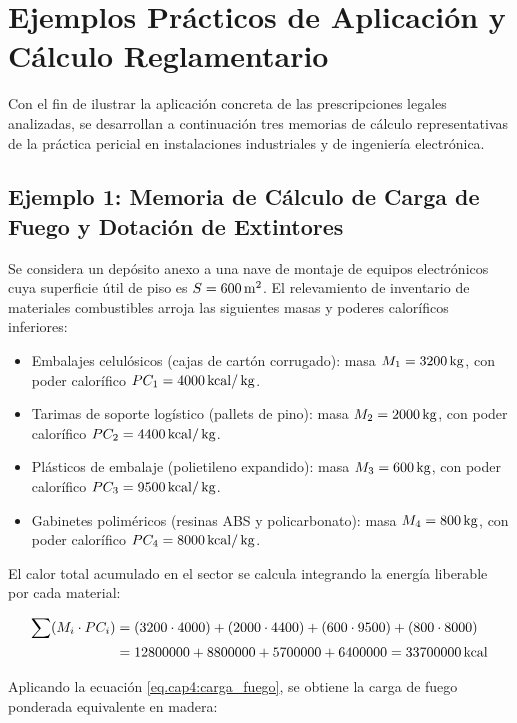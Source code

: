 \section{Ejemplos Prácticos de Aplicación y Cálculo Reglamentario}
\label{sec.cap4:ejemplos_practicos}

Con el fin de ilustrar la aplicación concreta de las prescripciones legales analizadas, se desarrollan a continuación
tres memorias de cálculo representativas de la práctica pericial en instalaciones industriales y de ingeniería
electrónica.

\subsection{Ejemplo 1: Memoria de Cálculo de Carga de Fuego y Dotación de Extintores}
\label{sec.cap4:ejemplo_carga_fuego}

Se considera un depósito anexo a una nave de montaje de equipos electrónicos cuya superficie útil de piso es $S = 600\,\mathrm{m}^2$.
El relevamiento de inventario de materiales combustibles arroja las siguientes masas y poderes caloríficos inferiores:

\begin{itemize}
    \item Embalajes celulósicos (cajas de cartón corrugado): masa $M_1 = 3200\,\mathrm{kg}$, con poder calorífico
          $PC_1 = 4000\,\mathrm{kcal}/\,\mathrm{kg}$.
    \item Tarimas de soporte logístico (pallets de pino): masa $M_2 = 2000\,\mathrm{kg}$, con poder calorífico
          $PC_2 = 4400\,\mathrm{kcal}/\,\mathrm{kg}$.
    \item Plásticos de embalaje (polietileno expandido): masa $M_3 = 600\,\mathrm{kg}$, con poder calorífico
          $PC_3 = 9500\,\mathrm{kcal}/\,\mathrm{kg}$.
    \item Gabinetes poliméricos (resinas ABS y policarbonato): masa $M_4 = 800\,\mathrm{kg}$, con poder calorífico
          $PC_4 = 8000\,\mathrm{kcal}/\,\mathrm{kg}$.
\end{itemize}

El calor total acumulado en el sector se calcula integrando la energía liberable por cada material:

\begin{align}
\sum (M_i \cdot PC_i) &= (3200 \cdot 4000) + (2000 \cdot 4400) + (600 \cdot 9500) + (800 \cdot 8000) \notag \\
&= 12800000 + 8800000 + 5700000 + 6400000 = 33700000\,\mathrm{kcal}
\end{align}

Aplicando la ecuación \ref{eq.cap4:carga_fuego}, se obtiene la carga de fuego ponderada equivalente en madera:

